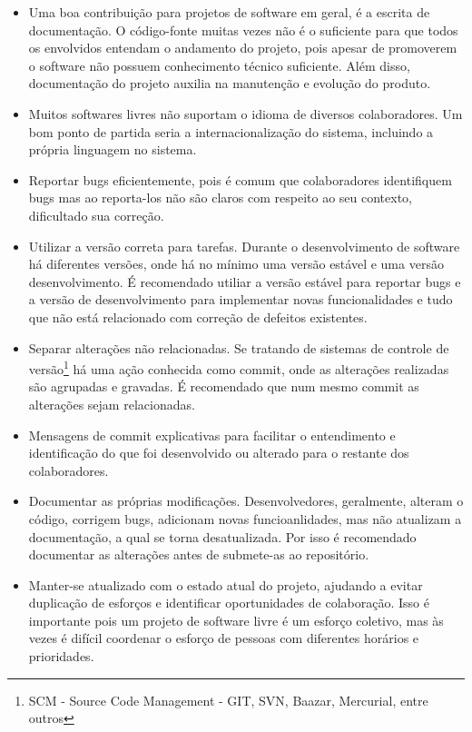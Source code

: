 \begin{itemize}
	\begin{itemize}

		\item Uma boa contribuição para projetos de software em geral, é a escrita de documentação. O código-fonte muitas vezes não é o suficiente para que todos os envolvidos entendam o andamento do projeto, pois apesar de promoverem o software não possuem conhecimento técnico suficiente. Além disso, documentação do projeto auxilia na manutenção e evolução do produto.

		\item Muitos softwares livres não suportam o idioma de diversos colaboradores. Um bom ponto de partida seria a internacionalização do sistema, incluindo a própria linguagem no sistema.

		\item Reportar bugs eficientemente, pois é comum que colaboradores identifiquem bugs mas ao reporta-los não são claros com respeito ao seu contexto, dificultado sua correção.

		\item Utilizar a versão correta para tarefas. Durante o desenvolvimento de software há diferentes versões, onde há no mínimo uma versão estável e uma versão desenvolvimento. É recomendado utiliar a versão estável para reportar bugs e a versão de desenvolvimento para implementar novas funcionalidades e tudo que não está relacionado com correção de defeitos existentes.

		\item Separar alterações não relacionadas. Se tratando de sistemas de controle de versão\footnote{SCM - Source Code Management - GIT, SVN, Baazar, Mercurial, entre outros} há uma ação conhecida como commit, onde as alterações realizadas são agrupadas e gravadas. É recomendado que num mesmo commit as alterações sejam relacionadas.

		\item Mensagens de commit explicativas para facilitar o entendimento e identificação do que foi desenvolvido ou alterado para o restante dos colaboradores.

		\item Documentar as próprias modificações. Desenvolvedores, geralmente, alteram o código, corrigem bugs, adicionam novas funcioanlidades, mas não atualizam a documentação, a qual se torna desatualizada. Por isso é recomendado documentar as alterações antes de submete-as ao repositório.

		\item Manter-se atualizado com o estado atual do projeto, ajudando a evitar duplicação de esforços e identificar oportunidades de colaboração. Isso é importante pois um projeto de software livre é um esforço coletivo, mas às vezes é difícil coordenar o esforço de pessoas com diferentes horários e prioridades.

	\end{itemize}

\end{itemize}

